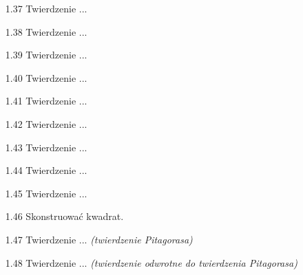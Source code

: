 \begin{enumerate}
    \item [1.37] Twierdzenie ... %
    \item [1.38] Twierdzenie ... %
    \item [1.39] Twierdzenie ... %
    \item [1.40] Twierdzenie ... %
    \item [1.41] Twierdzenie ... %
    \item [1.42] Twierdzenie ... %
    \item [1.43] Twierdzenie ... %
    \item [1.44] Twierdzenie ... %
    \item [1.45] Twierdzenie ... %
    \item [1.46] Skonstruować kwadrat.
    \item [1.47] Twierdzenie ... \hfill \emph{(twierdzenie Pitagorasa)} %
    \item [1.48] Twierdzenie ... \hfill \emph{(twierdzenie odwrotne do twierdzenia Pitagorasa)} %
\end{enumerate}

%